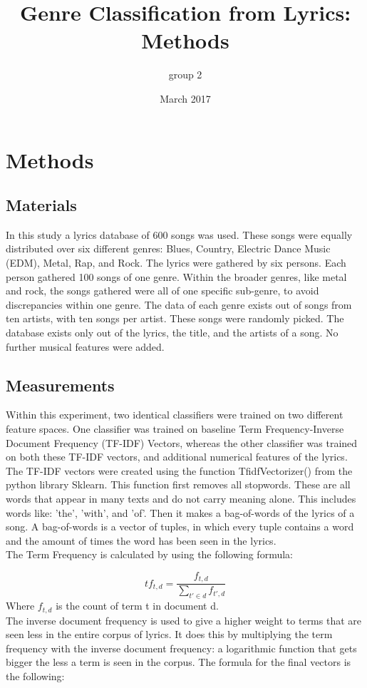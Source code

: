 \documentclass{article}
\title{Genre Classification from Lyrics: Methods}
\author{group 2}
\date{March 2017}
\begin{document}
\maketitle

\section{Methods}

\subsection{Materials}
In this study a lyrics database of 600 songs was used. These songs were equally distributed over six different genres: Blues, Country, Electric Dance Music (EDM), Metal, Rap, and Rock. The lyrics were gathered by six persons. Each person gathered 100 songs of one genre. Within the broader genres, like metal and rock, the songs gathered were all of one specific sub-genre, to avoid discrepancies within one genre. The data of each genre exists out of songs from ten artists, with ten songs per artist. These songs were randomly picked. The database exists only out of the lyrics, the title, and the artists of a song. No further musical features were added. 
\subsection{Measurements}
Within this experiment, two identical classifiers were trained on two different feature spaces. One classifier was trained on baseline Term Frequency-Inverse Document Frequency (TF-IDF) Vectors, whereas the other classifier was trained on both these TF-IDF vectors, and additional numerical features of the lyrics.\\[2ex]
The TF-IDF vectors were created using the function TfidfVectorizer() from the python library Sklearn. This function first removes all stopwords. These are all words that appear in many texts and do not carry meaning alone. This includes words like: 'the', 'with', and 'of'. Then it makes a bag-of-words of the lyrics of a song. A bag-of-words is a vector of tuples, in which every tuple contains a word and the amount of times the word has been seen in the lyrics.\\[2ex]
The Term Frequency is calculated by using the following formula:

$$ tf_{t,d} = \frac{f_{t,d}}{\sum_{t'\in d} f_{t',d}}$$
Where $f_{t,d}$ is the count of term t in document d.\\[2ex]
The inverse document frequency is used to give a higher weight to terms that are seen less in the entire corpus of lyrics. It does this by multiplying the term frequency with the inverse document frequency: a logarithmic function that gets bigger the less a term is seen in the corpus. The formula for the final vectors is the following:
\end{document}
